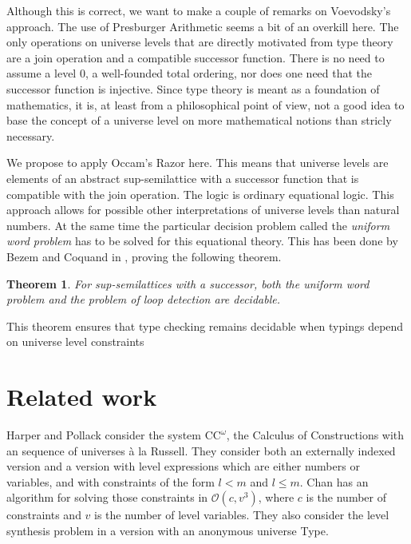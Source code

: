 \documentclass[11pt,a4paper]{article}
\newtheorem{theorem}{Theorem}[section]
\def\Ordo{\mathcal{O}}
\def\CComega{\mathrm{CC}^\omega}
\begin{document}
Although this is correct, we want to make a couple of remarks on Voevodsky's approach.
The use of Presburger Arithmetic seems a bit of an overkill here.
The only operations on universe levels that are directly motivated
from type theory are a join operation and a compatible successor function.
There is no need to assume a level 0, a well-founded total ordering,
nor does one need that the successor function is injective.
Since type theory is meant as a foundation of mathematics, it is,
at least from a philosophical point of view, 
not a good idea to base the concept of a universe level 
on more mathematical notions than stricly necessary.

We propose to apply Occam's Razor here. This means that universe levels
are elements of an abstract sup-semilattice with a successor function
that is compatible with the join operation. The logic is ordinary 
equational logic.
This approach allows for possible other interpretations of universe levels
than natural numbers. At the same time the particular decision problem
called the \emph{uniform word problem} has to be solved for this equational theory. 
This has been done by Bezem and Coquand in \cite{bezem-coquand:lattices},
proving the following theorem.

\begin{theorem}\label{thm:P-solvability}
For sup-semilattices with a successor, both the uniform word problem  
and the problem of loop detection are decidable.
\end{theorem}
This theorem ensures that type checking remains decidable when
typings depend on universe level constraints


\section{Related work}

Harper and Pollack \cite{HarperP91} consider the system $\CComega$, the Calculus of Constructions with an sequence of universes \`a la Russell. They consider both an externally indexed version and a version with level expressions which are either numbers or variables, and with constraints of the form $l < m$ and $l \leq m$. Chan has an algorithm for solving those constraints in $\Ordo(c,v^3)$, where $c$ is the number of constraints and $v$ is the number of level variables. They also consider the level synthesis problem in a version with an anonymous universe Type.
\end{document}
